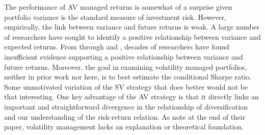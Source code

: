 The performance of AV managed returns is somewhat of a surprise given 
portfolio variance is the standard measure of investment risk. However, empirically, the link between variance and future returns is weak. A large number of researchers have sought to identify a positive relationship between variance and expected returns. From \citet{haugen_1972} through \citet{FRENCH19873} and \citet{ang_cross-section_2006}, decades of researchers have found insufficient evidence supporting a positive relationship between variance and future returns.  Moreover, the goal in examining volatility managed portfolios, neither in prior work nor here, is to best estimate the conditional Sharpe ratio. Some unmotivated variation of the SV strategy that does better would not be that interesting. One key advantage of the AV strategy is that it directly links an important and straightforward divergence in the relationship of diversification and our understanding of the risk-return relation. %
As \citet{moreira_volatility-managed_2017} note at the end of their paper, volatility management lacks an explanation or theoretical foundation. %
